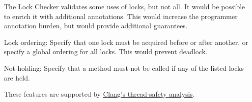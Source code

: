 The Lock Checker validates some uses of locks, but not all.  It would be
possible to enrich it with additional annotations.  This would increase the
programmer annotation burden, but would provide additional guarantees.

Lock ordering:  Specify that one lock must be acquired before or after
another, or specify a global ordering for all locks.  This would prevent
deadlock.

Not-holding:  Specify that a method must not be called if any of the listed
locks are held.

These features are supported by
\href{http://clang.llvm.org/docs/ThreadSafetyAnalysis.html}{Clang's
  thread-safety analysis}.


